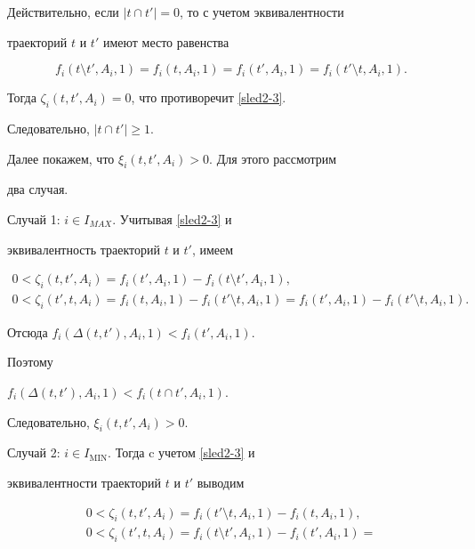 \begin{pf}
Действительно, если $|t \cap t'| = 0$, то с учетом эквивалентности


траекторий $t$ и $t'$ имеют место равенства


$$


f_i( t\setminus t', A_i, 1) =f_i(t, A_i, 1) =f_i(t', A_i, 1)=


f_i( t' \setminus t, A_i, 1).


$$


Тогда $\zeta_i(t, t', A_i)=0$, что противоречит \eqref{sled2-3}.


Следовательно, $|t \cap t'|\geq 1$.





Далее покажем, что $\xi_i(t, t', A_i)>0$. Для этого рассмотрим


два случая.





Случай 1: $i \in I_{MAX}$. Учитывая \eqref{sled2-3} и


эквивалентность траекторий $t$ и $t'$, имеем


\begin{gather*}


0<\zeta_i(t, t', A_i)=f_i(t', A_i, 1)-f_i( t\setminus t', A_i, 1),\\


0<\zeta_i(t', t, A_i)=f_i(t, A_i, 1)-f_i( t'\setminus t, A_i, 1)=


f_i(t', A_i, 1)-f_i( t'\setminus t, A_i, 1).


\end{gather*}


Отсюда $f_i( \Delta(t, t'), A_i, 1)<f_i(t', A_i, 1)$.


Поэтому 


$f_i( \Delta(t, t'), A_i, 1)<f_i(t \cap t', A_i, 1)$.


Следовательно, $\xi_i(t, t', A_i)>0$.





Случай 2: $i \in I_{\mathrm{MIN}}$. Тогда c учетом \eqref{sled2-3} и


эквивалентности траекторий $t$ и $t'$ выводим


\begin{gather*}


0<\zeta_i(t, t', A_i)=f_i( t' \setminus t, A_i, 1)-f_i(t, A_i, 1),\\


0<\zeta_i(t', t, A_i)=f_i( t \setminus t', A_i, 1)-f_i(t', A_i, 1)=



\end{gather*}
\end{pf}
